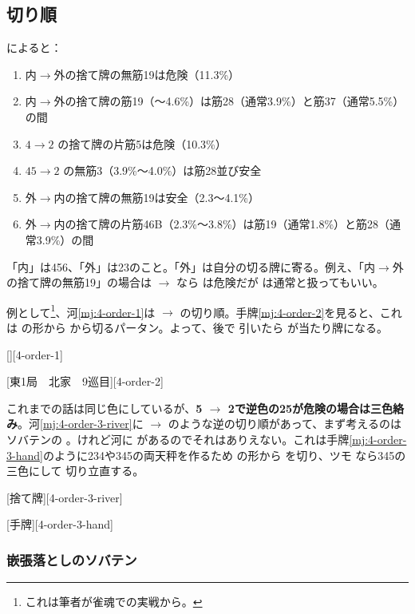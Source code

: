 \documentclass[10pt, twocolumn]{article}
\begin{document}
\subsection{切り順}

\citet[p. 176]{miinin-stat}によると：
%
\begin{enumerate}
\item 内$\to$外の捨て牌の無筋19は危険（11.3\%）
\item 内$\to$外の捨て牌の筋19（〜4.6\%）は筋28（通常3.9\%）と筋37（通常5.5\%）の間
\item $4 \to 2$ の捨て牌の片筋5は危険（10.3\%）
\item $45 \to 2$ の無筋3（3.9\%〜4.0\%）は筋28並び安全
\item 外$\to$内の捨て牌の無筋19は安全（2.3〜4.1\%）
\item 外$\to$内の捨て牌の片筋46B（2.3\%〜3.8\%）は筋19（通常1.8\%）と筋28（通常3.9\%）の間
\end{enumerate}

「内」は456、「外」は23のこと。「外」は自分の切る牌に寄る。例え、「内$\to$外の捨て牌の無筋19」の場合は  $\to$  なら  は危険だが  は通常と扱ってもいい。

例として\footnote{これは筆者が雀魂での実戦から。}、河\ref{mj:4-order-1}は  $\to$  の切り順。手牌\ref{mj:4-order-2}を見ると、これは  の形から  から切るパータン。よって、後で  引いたら  が当たり牌になる。

[][4-order-1]

[東1局　北家　9巡目][4-order-2]

これまでの話は同じ色にしているが、\textbf{5 $\to$ 2で逆色の25が危険の場合は三色絡み}\citep[][pp.~108--109]{takizawa-yomi}。河\ref{mj:4-order-3-river}に  $\to$  のような逆の切り順があって、まず考えるのはソバテンの 。けれど河に  があるのでそれはありえない。これは手牌\ref{mj:4-order-3-hand}のように234や345の両天秤を作るため  の形から  を切り、ツモ  なら345の三色にして  切り立直する。

[捨て牌][4-order-3-river]

[手牌][4-order-3-hand]

\subsubsection*{嵌張落としのソバテン} 
\end{document}
